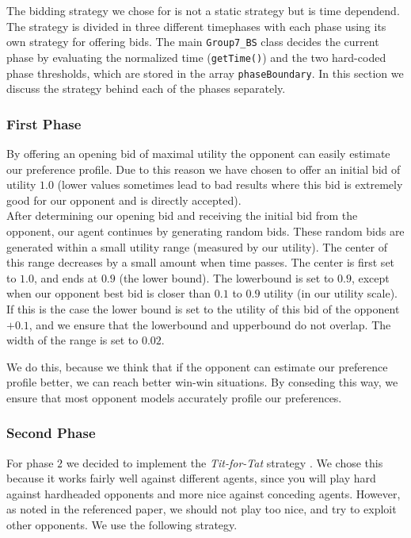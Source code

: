 The bidding strategy we chose for is not a static strategy but is time dependend. The strategy is divided in three different timephases with each phase using its own strategy for offering bids. The main \texttt{Group7\_BS} class decides the current phase by evaluating the normalized time (\texttt{getTime()}) and the two hard-coded phase thresholds, which are stored in the array \texttt{phaseBoundary}. In this section we discuss the strategy behind each of the phases separately.

\subsubsection{First Phase}
By offering an opening bid of maximal utility the opponent can easily estimate our preference profile. Due to this reason we have chosen to offer an initial bid of utility $1.0$ (lower values sometimes lead to bad results where this bid is extremely good for our opponent and is directly accepted).\\ 

After determining our opening bid and receiving the initial bid from the opponent, our agent continues by generating random bids. These random bids are generated within a small utility range (measured by our utility). The center of this range decreases by a small amount when time passes.
The center is first set to $1.0$, and ends at $0.9$ (the lower bound). The lowerbound is set to $0.9$, except when our opponent best bid is closer than $0.1$ to $0.9$ utility (in our utility scale). If this is the case the lower bound is set to the utility of this bid of the opponent $+0.1$, and we ensure that the lowerbound and upperbound do not overlap. The width of the range is set to  $0.02$. 

We do this, because we think that if the opponent can estimate our preference profile better,
we can reach better win-win situations. By conseding this way, we ensure that most opponent 
models accurately profile our preferences.

\subsubsection{Second Phase}

For phase $2$ we decided to implement the \emph{Tit-for-Tat} strategy \cite{titfortat}.
We chose this because it works fairly well against different agents, since you will play
hard against hardheaded opponents and more nice against conceding agents.
However, as noted in the referenced paper, we should not play too nice,
and try to exploit other opponents. We use the following strategy. \\


